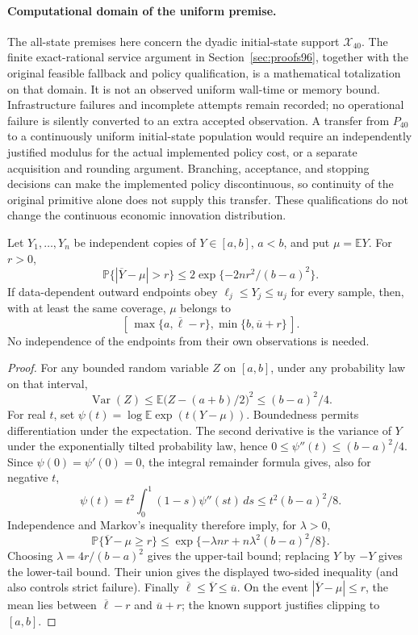 \paragraph{Computational domain of the uniform premise.}
The all-state premises here concern the dyadic initial-state support
\(\mathcal{X}_{40}\). The finite exact-rational service argument in
Section~\ref{sec:proofs96}, together with the original feasible fallback
and policy qualification, is a mathematical totalization on that
domain. It is not an observed uniform wall-time or memory bound.
Infrastructure failures and incomplete attempts remain recorded; no
operational failure is silently converted to an extra accepted
observation. A transfer from \(P_{40}\) to a continuously uniform
initial-state population would require an independently justified
modulus for the actual implemented policy cost, or a separate acquisition
and rounding argument. Branching, acceptance, and stopping decisions can
make the implemented policy discontinuous, so continuity of the original
primitive alone does not supply this transfer. These qualifications do
not change the continuous economic innovation distribution.

\begin{lemma}
\label{lem:bounded-mean122}
Let \(Y_1,\ldots,Y_n\) be independent copies of \(Y\in[a,b]\), \(a<b\),
and put \(\mu=\mathbb E Y\). For \(r>0\),
\[
 \mathbb P\{|\overline Y-\mu|>r\}
 \le 2\exp\{-2nr^2/(b-a)^2\}.
\]
If data-dependent outward endpoints obey
\(\ell_j\le Y_j\le u_j\) for every sample, then, with at least the same
coverage, \(\mu\) belongs to
\[
 [\,\max\{a,\overline\ell-r\},
       \min\{b,\overline u+r\}\,].
\]
No independence of the endpoints from their own observations is needed.
\end{lemma}

\begin{proof}
For any bounded random variable \(Z\) on \([a,b]\), under any probability
law on that interval,
\[
 \operatorname{Var}(Z)
 \le \mathbb E\bigl(Z-(a+b)/2\bigr)^2
 \le (b-a)^2/4.
\]
For real \(t\), set
\(\psi(t)=\log\mathbb E\exp(t(Y-\mu))\). Boundedness permits
differentiation under the expectation. The second derivative is the
variance of \(Y\) under the exponentially tilted probability law, hence
\(0\le\psi''(t)\le(b-a)^2/4\). Since
\(\psi(0)=\psi'(0)=0\), the integral remainder formula gives, also for
negative \(t\),
\[
 \psi(t)=t^2\int_0^1(1-s)\psi''(st)\,ds
 \le t^2(b-a)^2/8.
\]
Independence and Markov's inequality therefore imply, for \(\lambda>0\),
\[
 \mathbb P\{\overline Y-\mu\ge r\}
 \le \exp\{-\lambda nr+n\lambda^2(b-a)^2/8\}.
\]
Choosing \(\lambda=4r/(b-a)^2\) gives the upper-tail bound; replacing
\(Y\) by \(-Y\) gives the lower-tail bound. Their union gives the
displayed two-sided inequality (and also controls strict failure).
Finally \(\overline\ell\le\overline Y\le\overline u\). On the event
\(|\overline Y-\mu|\le r\), the mean lies between
\(\overline\ell-r\) and \(\overline u+r\); the known support justifies
clipping to \([a,b]\).
\end{proof}

